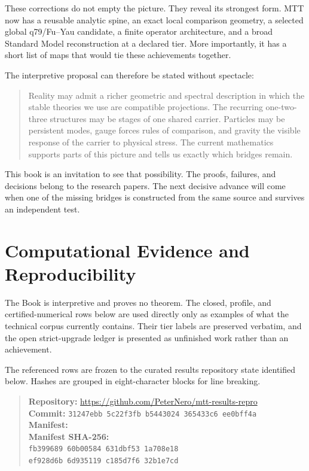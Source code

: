 \documentclass[11pt,openany]{book}
\begin{document}
These corrections do not empty the picture. They reveal its strongest form.
MTT now has a reusable analytic spine, an exact local comparison geometry, a
selected global q79/Fu--Yau candidate, a finite operator architecture, and a
broad Standard Model reconstruction at a declared tier. More importantly, it
has a short list of maps that would tie these achievements together.

The interpretive proposal can therefore be stated without spectacle:

\begin{quote}
Reality may admit a richer geometric and spectral description in which the
stable theories we use are compatible projections. The recurring
one-two-three structures may be stages of one shared carrier. Particles may
be persistent modes, gauge forces rules of comparison, and gravity the
visible response of the carrier to physical stress. The current mathematics
supports parts of this picture and tells us exactly which bridges remain.
\end{quote}

This book is an invitation to see that possibility. The proofs, failures, and
decisions belong to the research papers. The next decisive advance will come
when one of the missing bridges is constructed from the same source and
survives an independent test.

\backmatter

\section*{Computational Evidence and Reproducibility}
The Book is interpretive and proves no theorem. The closed, profile, and certified-numerical rows below are used directly only as examples of what the technical corpus currently contains. Their tier labels are preserved verbatim, and the open strict-upgrade ledger is presented as unfinished work rather than an achievement.

The referenced rows are frozen to the curated results repository state identified below. Hashes are grouped in eight-character blocks for line breaking.
\begin{quote}\small
\textbf{Repository:} \url{https://github.com/PeterNero/mtt-results-repro}\\
\textbf{Commit:} \texttt{31247ebb 5c22f3fb b5443024 365433c6 ee0bff4a}\\
\textbf{Manifest:} \\
\textbf{Manifest SHA-256:}\\
\texttt{fb399689 60b00584 631dbf53 1a708e18}\\
\texttt{ef928d6b 6d935119 c185d7f6 32b1e7cd}
\end{quote}
\end{document}

